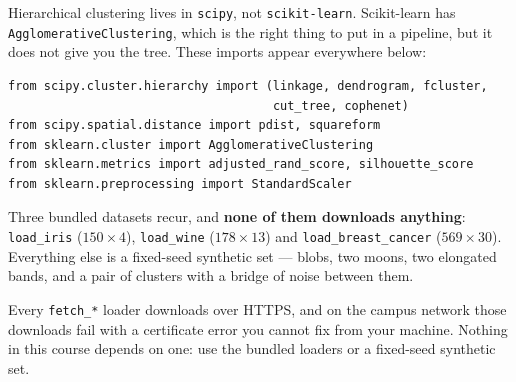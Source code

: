 \documentclass[11pt]{article}
\begin{document}
\begin{sloppypar}
Hierarchical clustering lives in \texttt{scipy}, not \texttt{scikit-learn}.
Scikit-learn has \texttt{AgglomerativeClustering}, which is the right thing to
put in a pipeline, but it does not give you the tree. These imports appear
everywhere below:
\end{sloppypar}

\begin{lstlisting}
from scipy.cluster.hierarchy import (linkage, dendrogram, fcluster,
                                     cut_tree, cophenet)
from scipy.spatial.distance import pdist, squareform
from sklearn.cluster import AgglomerativeClustering
from sklearn.metrics import adjusted_rand_score, silhouette_score
from sklearn.preprocessing import StandardScaler
\end{lstlisting}

Three bundled datasets recur, and \textbf{none of them downloads anything}:
\texttt{load\_iris} ($150 \times 4$), \texttt{load\_wine} ($178 \times 13$) and
\texttt{load\_breast\_cancer} ($569 \times 30$). Everything else is a
fixed-seed synthetic set --- blobs, two moons, two elongated bands, and a pair
of clusters with a bridge of noise between them.

\begin{caution}
Every \texttt{fetch\_*} loader downloads over HTTPS, and on the campus network
those downloads fail with a certificate error you cannot fix from your machine.
Nothing in this course depends on one: use the bundled loaders or a fixed-seed
synthetic set.
\end{caution}
\end{document}
